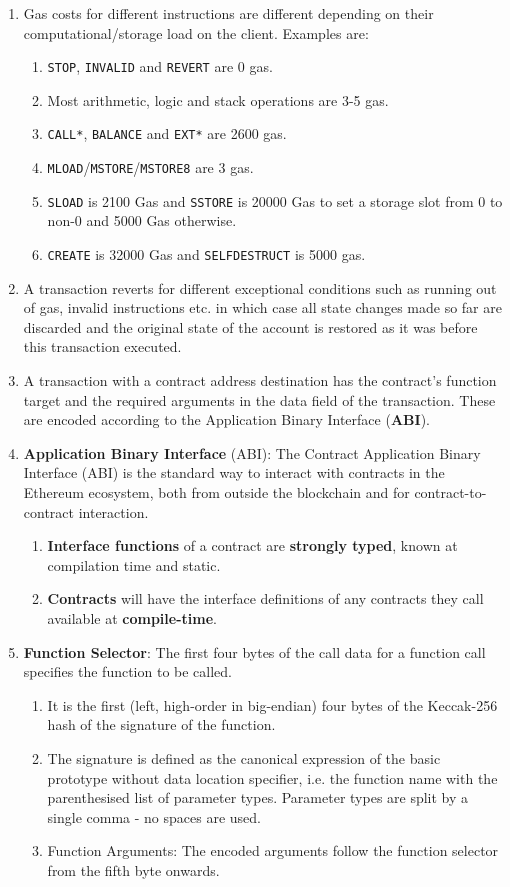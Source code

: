 \begin{enumerate}
\item Gas costs for different instructions are different depending on their computational/storage load on the client. Examples are:
\begin{enumerate}
\item\verb|STOP|, \verb|INVALID| and \verb|REVERT| are 0 gas.
\item Most arithmetic, logic and stack operations are 3-5 gas.
\item\verb|CALL*|, \verb|BALANCE| and \verb|EXT*| are 2600 gas.
\item\verb|MLOAD|/\verb|MSTORE|/\verb|MSTORE8| are 3 gas.
\item\verb|SLOAD| is 2100 Gas and \verb|SSTORE| is 20000 Gas to set a storage slot from 0 to non-0 and 5000 Gas otherwise.
\item\verb|CREATE| is 32000 Gas and \verb|SELFDESTRUCT| is 5000 gas.
\end{enumerate}

\item A transaction reverts for different exceptional conditions such as running out of gas, invalid instructions etc. in which case all state changes made so far are discarded and the original state of the account is restored as it was before this transaction executed.

\item A transaction with a contract address destination has the contract's function target and the required arguments in the data field of the transaction. These are encoded according to the Application Binary Interface (\textbf{ABI}).

\item\textbf{Application Binary Interface} (ABI): The Contract Application Binary Interface (ABI) is the standard way to interact with contracts in the Ethereum ecosystem, both from outside the blockchain and for contract-to-contract interaction.
\begin{enumerate}
\item\textbf{Interface functions} of a contract are \textbf{strongly typed}, known at compilation time and static.
\item\textbf{Contracts} will have the interface definitions of any contracts they call available at \textbf{compile-time}.
\end{enumerate}

\item\textbf{Function Selector}: The first four bytes of the call data for a function call specifies the function to be called.
\begin{enumerate}
\item It is the first (left, high-order in big-endian) four bytes of the Keccak-256 hash of the signature of the function.
\item The signature is defined as the canonical expression of the basic prototype without data location specifier, i.e. the function name with the parenthesised list of parameter types. Parameter types are split by a single comma - no spaces are used.
\item Function Arguments: The encoded arguments follow the function selector from the fifth byte onwards.
\end{enumerate}


\end{enumerate}
